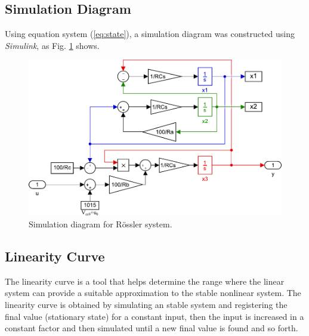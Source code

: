 \subsection{Simulation Diagram}
Using equation system (\ref{eq:state}), a simulation diagram was constructed using \textit{Simulink}, as Fig. \ref{fig:simulink} shows.
\begin{figure}
    \centering
    \includegraphics[scale=0.55]{figs/simulink.pdf}
    \caption{Simulation diagram for R\"ossler system.}
    \label{fig:simulink}
\end{figure}

\subsection{Linearity Curve}
The linearity curve is a tool that helps determine the range where the linear system can provide a suitable approximation to the stable nonlinear system. The linearity curve is obtained by simulating an stable system and registering the final value (stationary state) for a constant input, then the input is increased in a constant factor and then simulated until a new final value is found and so forth.

